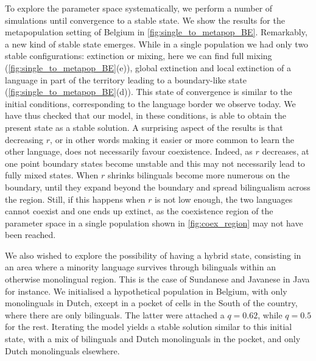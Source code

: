 \documentclass[../thesis.tex]{subfiles}
\begin{document}
To explore the parameter space systematically, we perform a number of simulations until
convergence to a stable state. We show the results for the metapopulation setting of
Belgium in \cref{fig:single_to_metapop_BE}. Remarkably, a new kind of stable state
emerges. While in a single population we had only two stable configurations: extinction
or mixing, here we can find full mixing (\cref{fig:single_to_metapop_BE}(e)), global
extinction and local extinction of a language in part of the territory leading to a
boundary-like state (\cref{fig:single_to_metapop_BE}(d)). This state of convergence is
similar to the initial conditions, corresponding to the language border we observe
today. We have thus checked that our model, in these conditions, is able to obtain the
present state as a stable solution. A surprising aspect of the results is that
decreasing $r$, or in other words making it easier or more common to learn the other
language, does not necessarily favour coexistence. Indeed, as $r$ decreases, at one
point boundary states become unstable and this may not necessarily lead to fully mixed
states. When $r$ shrinks bilinguals become more numerous on the boundary, until they
expand beyond the boundary and spread bilingualism across the region. Still, if this
happens when $r$ is not low enough, the two languages cannot coexist and one ends up
extinct, as the coexistence region of the parameter space in a single population shown
in \cref{fig:coex_region} may not have been reached. 

We also wished to explore the possibility of having a hybrid state, consisting in an
area where a minority language survives through bilinguals within an otherwise
monolingual region. This is the case of Sundanese and Javanese in Java for instance. We
initialised a hypothetical population in Belgium, with only monolinguals in Dutch,
except in a pocket of cells in the South of the country, where there are only
bilinguals. The latter were attached a $q = 0.62$, while $q = 0.5$ for the rest.
Iterating the model yields a stable solution similar to this initial state, with a mix
of bilinguals and Dutch monolinguals in the pocket, and only Dutch monolinguals
elsewhere.
\end{document}
